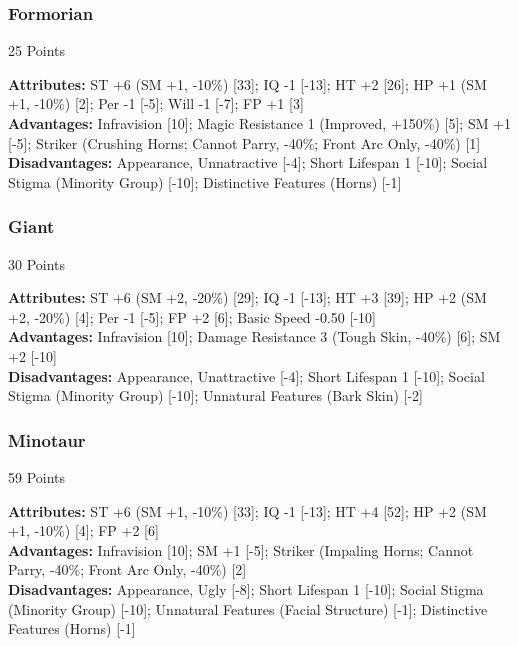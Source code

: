 \begin{multicols*}{3}
	\subsubsection*{Formorian}
	\begin{flushright}
		25 Points
	\end{flushright}
	\textbf{Attributes:} 
	ST +6 (SM +1, -10\%) [33]; IQ -1 [-13]; HT +2 [26]; HP +1 (SM +1, -10\%) [2]; Per -1 [-5]; Will -1 [-7]; FP +1 [3]
	\\\textbf{Advantages:} 
	Infravision [10]; Magic Resistance 1 (Improved, +150\%) [5]; SM +1 [-5]; Striker (Crushing Horns; Cannot Parry, -40\%; Front Arc Only, -40\%) [1]
	\\\textbf{Disadvantages:} 
	Appearance, Unnatractive [-4]; Short Lifespan 1 [-10]; Social Stigma (Minority Group) [-10]; Distinctive Features (Horns) [-1]
	
	\subsubsection*{Giant}
	\begin{flushright}
		30 Points
	\end{flushright}
	\textbf{Attributes:} 
	ST +6 (SM +2, -20\%) [29]; IQ -1 [-13]; HT +3 [39]; HP +2 (SM +2, -20\%) [4]; Per -1 [-5]; FP +2 [6]; Basic Speed -0.50 [-10]
	\\\textbf{Advantages:} 
	Infravision [10]; Damage Resistance 3 (Tough Skin, -40\%) [6]; SM +2 [-10]
	\\\textbf{Disadvantages:} 
	Appearance, Unattractive [-4]; Short Lifespan 1 [-10]; Social Stigma (Minority Group) [-10]; Unnatural Features (Bark Skin) [-2]
	
	\subsubsection*{Minotaur}
	\begin{flushright}
		59 Points
	\end{flushright}
	\textbf{Attributes:} 
	ST +6 (SM +1, -10\%) [33]; IQ -1 [-13]; HT +4 [52]; HP +2 (SM +1, -10\%) [4]; FP +2 [6]
	\\\textbf{Advantages:} 
	Infravision [10]; SM +1 [-5]; Striker (Impaling Horns; Cannot Parry, -40\%; Front Arc Only, -40\%) [2]
	\\\textbf{Disadvantages:} 
	Appearance, Ugly [-8]; Short Lifespan 1 [-10]; Social Stigma (Minority Group) [-10]; Unnatural Features (Facial Structure) [-1]; Distinctive Features (Horns) [-1]
	

\end{multicols*}

